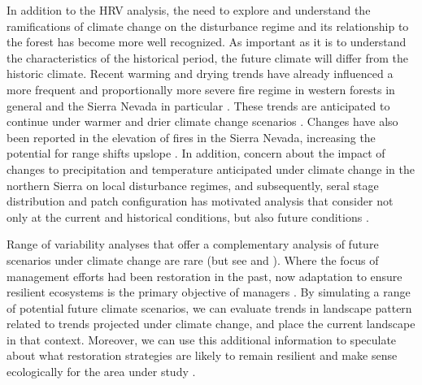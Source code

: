 In addition to the HRV analysis, the need to explore and understand the ramifications of climate change on the disturbance regime and its relationship to the forest has become more well recognized. As important as it is to understand the characteristics of the historical period, the future climate will differ from the historic climate. 
%
Recent warming and drying trends have already influenced a more frequent and proportionally more severe fire regime in western forests in general and the Sierra Nevada in particular \citep{McKenzie2004,Westerling2011,Miller2012}. These trends are anticipated to continue under warmer and drier climate change scenarios \citep{Westerling2008}. Changes have also been reported in the elevation of fires in the Sierra Nevada, increasing the potential for range shifts upslope \citep{Schwartz2015}. In addition, concern about the impact of changes to precipitation and temperature anticipated under climate change in the northern Sierra on local disturbance regimes, and subsequently, seral stage distribution and patch configuration has motivated analysis that consider not only at the current and historical conditions, but also future conditions \citep{Fule2008,North2012}.

Range of variability analyses that offer a complementary analysis of future scenarios under climate change are rare (but see \cite{Keane2008} and \cite{Duveneck2014}). Where the focus of management efforts had been restoration in the past, now adaptation to ensure resilient ecosystems is the primary objective of managers \citep{Stephens2010}. By simulating a range of potential future climate scenarios, we can evaluate trends in landscape pattern related to trends projected under climate change, and place the current landscape in that context. Moreover, we can use this additional information to speculate about what restoration strategies are likely to remain resilient and make sense ecologically for the area under study \citep{Duncan2010}. 

